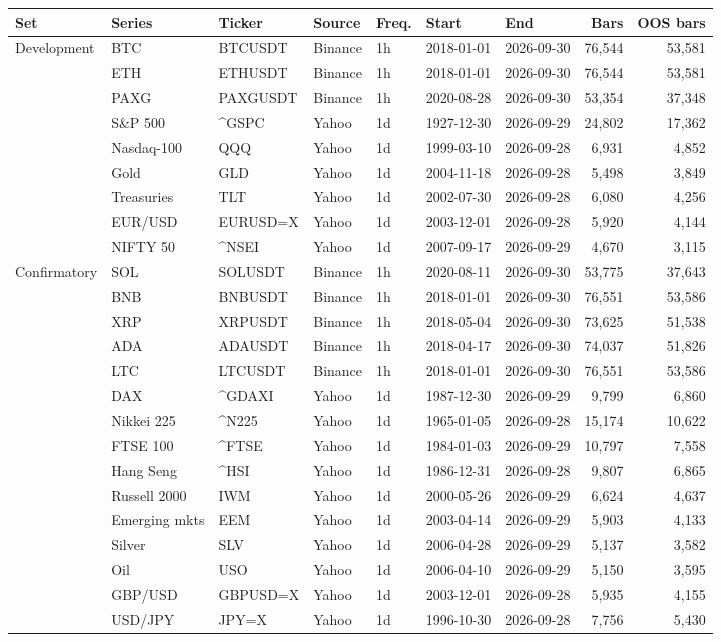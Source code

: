 \begin{tabular}{lllllllrr}
\toprule
Set & Series & Ticker & Source & Freq. & Start & End & Bars & OOS bars \\
\midrule
Development & BTC & BTCUSDT & Binance & 1h & 2018-01-01 & 2026-09-30 & 76,544 & 53,581\\
 & ETH & ETHUSDT & Binance & 1h & 2018-01-01 & 2026-09-30 & 76,544 & 53,581\\
 & PAXG & PAXGUSDT & Binance & 1h & 2020-08-28 & 2026-09-30 & 53,354 & 37,348\\
 & S\&P 500 & \textasciicircum{}GSPC & Yahoo & 1d & 1927-12-30 & 2026-09-29 & 24,802 & 17,362\\
 & Nasdaq-100 & QQQ & Yahoo & 1d & 1999-03-10 & 2026-09-28 & 6,931 & 4,852\\
 & Gold & GLD & Yahoo & 1d & 2004-11-18 & 2026-09-28 & 5,498 & 3,849\\
 & Treasuries & TLT & Yahoo & 1d & 2002-07-30 & 2026-09-28 & 6,080 & 4,256\\
 & EUR/USD & EURUSD=X & Yahoo & 1d & 2003-12-01 & 2026-09-28 & 5,920 & 4,144\\
 & NIFTY 50 & \textasciicircum{}NSEI & Yahoo & 1d & 2007-09-17 & 2026-09-29 & 4,670 & 3,115\\
\midrule
Confirmatory & SOL & SOLUSDT & Binance & 1h & 2020-08-11 & 2026-09-30 & 53,775 & 37,643\\
 & BNB & BNBUSDT & Binance & 1h & 2018-01-01 & 2026-09-30 & 76,551 & 53,586\\
 & XRP & XRPUSDT & Binance & 1h & 2018-05-04 & 2026-09-30 & 73,625 & 51,538\\
 & ADA & ADAUSDT & Binance & 1h & 2018-04-17 & 2026-09-30 & 74,037 & 51,826\\
 & LTC & LTCUSDT & Binance & 1h & 2018-01-01 & 2026-09-30 & 76,551 & 53,586\\
 & DAX & \textasciicircum{}GDAXI & Yahoo & 1d & 1987-12-30 & 2026-09-29 & 9,799 & 6,860\\
 & Nikkei 225 & \textasciicircum{}N225 & Yahoo & 1d & 1965-01-05 & 2026-09-28 & 15,174 & 10,622\\
 & FTSE 100 & \textasciicircum{}FTSE & Yahoo & 1d & 1984-01-03 & 2026-09-29 & 10,797 & 7,558\\
 & Hang Seng & \textasciicircum{}HSI & Yahoo & 1d & 1986-12-31 & 2026-09-28 & 9,807 & 6,865\\
 & Russell 2000 & IWM & Yahoo & 1d & 2000-05-26 & 2026-09-29 & 6,624 & 4,637\\
 & Emerging mkts & EEM & Yahoo & 1d & 2003-04-14 & 2026-09-29 & 5,903 & 4,133\\
 & Silver & SLV & Yahoo & 1d & 2006-04-28 & 2026-09-29 & 5,137 & 3,582\\
 & Oil & USO & Yahoo & 1d & 2006-04-10 & 2026-09-29 & 5,150 & 3,595\\
 & GBP/USD & GBPUSD=X & Yahoo & 1d & 2003-12-01 & 2026-09-28 & 5,935 & 4,155\\
 & USD/JPY & JPY=X & Yahoo & 1d & 1996-10-30 & 2026-09-28 & 7,756 & 5,430\\
\bottomrule
\end{tabular}
